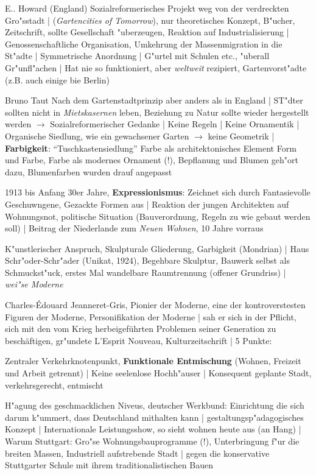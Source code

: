 \documentclass[emulatestandardclasses]{scrartcl}
\begin{document}
\begin{description}[leftmargin=!,labelwidth=\widthof{\bfseries P1}]
  \item[Gartenstadt] E.. Howard (England) Sozialreformerisches Projekt weg von der verdreckten Gro"sstadt |  (\emph{Gartencities of Tomorrow}), nur theoretisches Konzept, B"ucher, Zeitschrift, sollte Gesellschaft "uberzeugen, Reaktion auf Industrialisierung | Genossenschaftliche Organisation, Umkehrung der Massenmigration in die St"adte | Symmetrische Anordnung | G"urtel mit Schulen etc., "uberall Gr"unfl"achen | Hat nie so funktioniert, aber \emph{weltweit} rezipiert, Gartenvorst"adte (z.B. auch einige bie Berlin)
  \item[Falkenstadt] Bruno Taut Nach dem Gartenstadtprinzip aber anders als in England | ST"dter sollten nicht in \emph{Mietskasernen} leben, Beziehung zu Natur sollte wieder hergestellt werden $\rightarrow$ Sozialreformerischer Gedanke | Keine Regeln | Keine Ornamentik | Organische Siedlung, wie ein gewachsener Garten $\rightarrow$ keine Geometrik | \textbf{Farbigkeit}: "`Tuschkastensiedlung"' Farbe als architektonisches Element Form und Farbe, Farbe als modernes Ornament (!), Bepflanung und Blumen geh"ort dazu, Blumenfarben wurden drauf angepasst
  \item[Amsterdamer Schule] 1913 bis Anfang 30er Jahre, \textbf{Expressionismus}: Zeichnet sich durch Fantasievolle Geschuwngene, Gezackte Formen aus | Reaktion der jungen Architekten auf Wohnungsnot, politische Situation (Bauverordnung, Regeln zu wie gebaut werden soll) | Beitrag der Niederlande zum \emph{Neuen Wohnen}, 10 Jahre vorraus
  \item[De Stijl] K"unstlerischer Anspruch, Skulpturale Gliederung, Garbigkeit (Mondrian) | Haus Schr"oder-Schr"ader (Unikat, 1924), Begehbare Skulptur, Bauwerk selbst als Schmuckst"uck, erstes Mal wandelbare Raumtrennung (offener Grundriss) | \emph{wei"se Moderne}
  \item[Le Corbusier] Charles-Édouard Jeanneret-Gris, Pionier der Moderne, eine der kontroverstesten Figuren der Moderne, Personifikation der Moderne | sah er sich in der Pflicht, sich mit den vom Krieg herbeigeführten Problemen seiner Generation zu beschäftigen, gr"undete L’Esprit Nouveau, Kulturzeitschrift | 5 Punkte: 
  \item[Ville Contemporaine] Zentraler Verkehrknotenpunkt, \textbf{Funktionale Entmischung} (Wohnen, Freizeit und Arbeit getrennt) | Keine seelenlose Hochh"auser | Konsequent geplante Stadt, verkehrsgerecht, entmischt
  \item[Werkbundsiedlung Wei"senhof] H"agung des geschmacklichen Niveus, deutscher Werkbund: Einrichtung die sich darum k"ummert, dass Deutschland mithalten kann | gestaltungsp"adagogisches Konzept | Internationale Leistungsshow, so sieht wohnen heute aus (an Hang) | Warum Stuttgart: Gro"se Wohnungsbauprogramme (!), Unterbringung f"ur die breiten Massen, Industriell aufstrebende Stadt | gegen die konservative Stuttgarter Schule mit ihrem traditionalistischen Bauen
\end{description}
\end{document}
